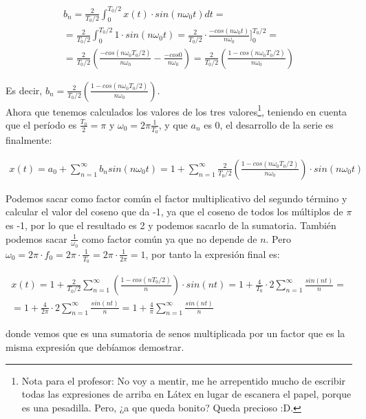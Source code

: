\documentclass[11pt,a4paper]{article}
\begin{document}
\begin{gather*}
	b_n = \frac{2}{T_0/2}\int_{0}^{T_0/2} x(t)\cdot sin(n\omega_0 t)dt = \\
	= \frac{2}{T_0/2}\int_{0}^{T_0/2} 1\cdot sin(n\omega_0 t) 
	= \frac{2}{T_0/2}\cdot \frac{-cos(n\omega_0 t)}{n\omega_0}\bigg]_{0}^{T_0/2} = \\
	= \frac{2}{T_0/2}\left( \frac{-cos(n\omega_0T_0/2)}{n\omega_0} - \frac{-cos 0}{n\omega_0}\right)
	= \frac{2}{T_0/2}\left(\frac{1-cos(n\omega_0T_0/2)}{n\omega_0} \right)
\end{gather*}

Es decir, $b_n = \frac{2}{T_0/2}\left(\frac{1-cos(n\omega_0T_0/2)}{n\omega_0} \right)$.\\

Ahora que tenemos calculados los valores de los tres valores\footnote{Nota para el profesor: No voy a mentir, me he arrepentido mucho de escribir todas las expresiones de arriba en Látex en lugar de escanera el papel, porque es una pesadilla. Pero, ¿a que queda bonito? Queda precioso :D.}, teniendo en cuenta que el período es $\frac{T_0}{2} = \pi$ y $\omega_0 = 2\pi \frac{1}{T_0}$, y que $a_n$ es 0, el desarrollo de la serie es finalmente:


\begin{gather*}
	x(t) = a_0+\sum_{n=1}^{\infty} b_n sin(n\omega_0 t)
	= 1 + \sum_{n=1}^{\infty} \frac{2}{T_0/2} \left(\frac{1-cos(n\omega_0 T_0/2)}{n\omega_0} \right) \cdot sin(n\omega_0 t)
\end{gather*}

Podemos sacar como factor común el factor multiplicativo del segundo término y calcular el valor del coseno que da -1, ya que el coseno de todos los múltiplos de $\pi$ es -1, por lo que el resultado es 2 y podemos sacarlo de la sumatoria. También podemos sacar $\frac{1}{\omega_0}$ como factor común ya que no depende de $n$. Pero $\omega_0=2\pi\cdot f_0=2\pi\cdot \frac{1}{T_0}=2\pi\cdot \frac{1}{2\pi}=1$, por tanto la expresión final es:

\begin{gather*}
	x(t) = 1+ \frac{2}{T_0/2}\sum_{n=1}^{\infty} \left(\frac{1-cos(n T_0/2)}{n} \right) \cdot sin(n t)
	= 1 + \frac{4}{T_0}\cdot 2\sum_{n=1}^{\infty}\frac{sin(nt)}{n} =\\
	= 1+ \frac{4}{2\pi}\cdot 2\sum_{n=1}^{\infty}\frac{sin(nt)}{n} = 1+ \frac{4}{\pi}\sum_{n=1}^{\infty}\frac{sin(nt)}{n}
\end{gather*}

donde vemos que es una sumatoria de senos multiplicada por un factor que es la misma expresión que debíamos demostrar.
\end{document}
